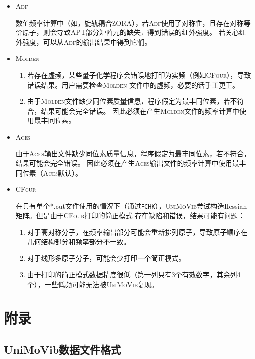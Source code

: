 \documentclass[12pt,a4paper,openany,twoside,cap,UTF8]{ctexbook}
\begin{document}
\begin{itemize}
\item \textsc{Adf}

数值频率计算中（如，旋轨耦合ZORA），若\textsc{Adf}使用了对称性，且存在对称等价原子，则会导致APT部分矩阵元的缺失，得到错误的红外强度。
若关心红外强度，可以从\textsc{Adf}的输出结果中得到它们。

\item \textsc{Molden}

\begin{enumerate}
\item 若存在虚频，某些量子化学程序会错误地打印为实频（例如\textsc{CFour}），导致错误结果。用户需要检查\textsc{Molden}
文件中的虚频，必要的话手工更正。

\item 由于\textsc{Molden}文件缺少同位素质量信息，程序假定为最丰同位素，若不符合，结果可能会完全错误。
因此必须在产生\textsc{Molden}文件的频率计算中使用最丰同位素。
\end{enumerate}

\item \textsc{Aces}

由于\textsc{Aces}输出文件缺少同位素质量信息，程序假定为最丰同位素，若不符合，结果可能会完全错误。
因此必须在产生\textsc{Aces}输出文件的频率计算中使用最丰同位素（\textsc{Aces}默认）。

\item \textsc{CFour}

在只有单个*.out文件使用的情况下（通过\verb|FCHK|），\textsc{UniMoVib}尝试构造Hessian矩阵。但是由于\textsc{CFour}打印的简正模式
存在缺陷和错误，结果可能有问题：
\begin{enumerate}
  \item 对于高对称分子，在频率输出部分可能会重新排列原子，导致原子顺序在几何结构部分和频率部分不一致。
  \item 对于线形多原子分子，可能会少打印一个简正模式。
  \item 由于打印的简正模式数据精度很低（第一列只有3个有效数字，其余列4个），一些低频可能无法被\textsc{UniMoVib}复现。
\end{enumerate}

\end{itemize}

\appendix
\chapter{附录} \label{part:appdx}

\section{UniMoVib数据文件格式} \label{sec:almfmt}
\end{document}
